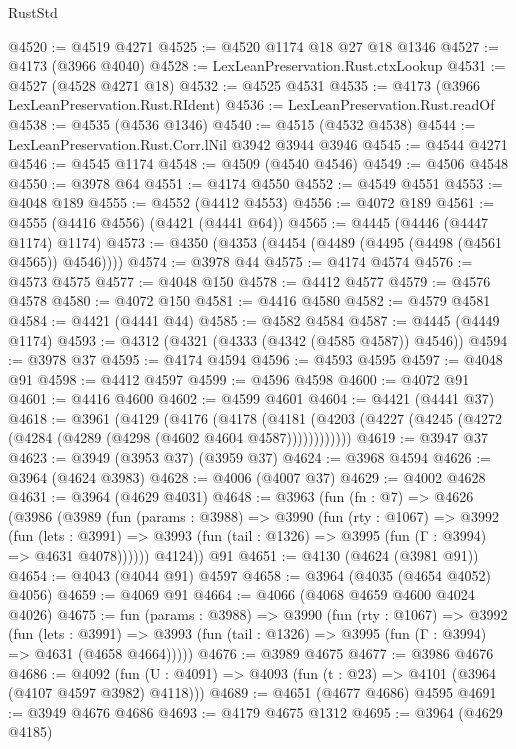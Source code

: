 \begin{lexlean}{RustStd}
\begin{coremodule}
@4520 := @4519 @4271
@4525 := @4520 @1174 @18 @27 @18 @1346
@4527 := @4173 (@3966 @4040)
@4528 := LexLeanPreservation.Rust.ctxLookup
@4531 := @4527 (@4528 @4271 @18)
@4532 := @4525 @4531
@4535 := @4173 (@3966 LexLeanPreservation.Rust.RIdent)
@4536 := LexLeanPreservation.Rust.readOf
@4538 := @4535 (@4536 @1346)
@4540 := @4515 (@4532 @4538)
@4544 := LexLeanPreservation.Rust.Corr.lNil @3942 @3944 @3946
@4545 := @4544 @4271
@4546 := @4545 @1174
@4548 := @4509 (@4540 @4546)
@4549 := @4506 @4548
@4550 := @3978 @64
@4551 := @4174 @4550
@4552 := @4549 @4551
@4553 := @4048 @189
@4555 := @4552 (@4412 @4553)
@4556 := @4072 @189
@4561 := @4555 (@4416 @4556) (@4421 (@4441 @64))
@4565 := @4445 (@4446 (@4447 @1174) @1174)
@4573 := @4350 (@4353 (@4454 (@4489 (@4495 (@4498 (@4561 @4565)) @4546))))
@4574 := @3978 @44
@4575 := @4174 @4574
@4576 := @4573 @4575
@4577 := @4048 @150
@4578 := @4412 @4577
@4579 := @4576 @4578
@4580 := @4072 @150
@4581 := @4416 @4580
@4582 := @4579 @4581
@4584 := @4421 (@4441 @44)
@4585 := @4582 @4584
@4587 := @4445 (@4449 @1174)
@4593 := @4312 (@4321 (@4333 (@4342 (@4585 @4587)) @4546))
@4594 := @3978 @37
@4595 := @4174 @4594
@4596 := @4593 @4595
@4597 := @4048 @91
@4598 := @4412 @4597
@4599 := @4596 @4598
@4600 := @4072 @91
@4601 := @4416 @4600
@4602 := @4599 @4601
@4604 := @4421 (@4441 @37)
@4618 := @3961
    (@4129
      (@4176
        (@4178
          (@4181 (@4203 (@4227 (@4245 (@4272 (@4284 (@4289 (@4298 (@4602 @4604 @4587))))))))))))
@4619 := @3947 @37
@4623 := @3949 (@3953 @37) (@3959 @37)
@4624 := @3968 @4594
@4626 := @3964 (@4624 @3983)
@4628 := @4006 (@4007 @37)
@4629 := @4002 @4628
@4631 := @3964 (@4629 @4031)
@4648 := @3963
    (fun (fn : @7) =>
    @4626
      (@3986
        (@3989
          (fun (params : @3988) =>
          @3990
            (fun (rty : @1067) =>
            @3992
              (fun (lets : @3991) =>
              @3993 (fun (tail : @1326) => @3995 (fun (Γ : @3994) => @4631 @4078))))))
        @4124))
    @91
@4651 := @4130 (@4624 (@3981 @91))
@4654 := @4043 (@4044 @91) @4597
@4658 := @3964 (@4035 (@4654 @4052) @4056)
@4659 := @4069 @91
@4664 := @4066 (@4068 @4659 @4600 @4024 @4026)
@4675 := fun (params : @3988) =>
  @3990
    (fun (rty : @1067) =>
    @3992
      (fun (lets : @3991) =>
      @3993 (fun (tail : @1326) => @3995 (fun (Γ : @3994) => @4631 (@4658 @4664)))))
@4676 := @3989 @4675
@4677 := @3986 @4676
@4686 := @4092 (fun (U : @4091) => @4093 (fun (t : @23) => @4101 (@3964 (@4107 @4597 @3982) @4118)))
@4689 := @4651 (@4677 @4686) @4595
@4691 := @3949 @4676 @4686
@4693 := @4179 @4675 @1312
@4695 := @3964 (@4629 @4185)

\end{coremodule}
\end{lexlean}
